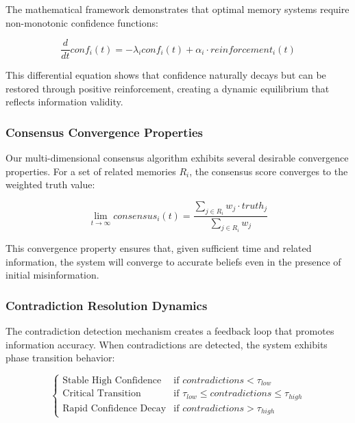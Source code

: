 \documentclass[12pt,a4paper]{article}
\begin{document}
The mathematical framework demonstrates that optimal memory systems require non-monotonic confidence functions:

\begin{equation}
\frac{d}{dt}conf_i(t) = -\lambda_i conf_i(t) + \alpha_i \cdot reinforcement_i(t)
\end{equation}

This differential equation shows that confidence naturally decays but can be restored through positive reinforcement, creating a dynamic equilibrium that reflects information validity.

\subsubsection{Consensus Convergence Properties}

Our multi-dimensional consensus algorithm exhibits several desirable convergence properties. For a set of related memories $R_i$, the consensus score converges to the weighted truth value:

\begin{equation}
\lim_{t \to \infty} consensus_i(t) = \frac{\sum_{j \in R_i} w_j \cdot truth_j}{\sum_{j \in R_i} w_j}
\end{equation}

This convergence property ensures that, given sufficient time and related information, the system will converge to accurate beliefs even in the presence of initial misinformation.

\subsubsection{Contradiction Resolution Dynamics}

The contradiction detection mechanism creates a feedback loop that promotes information accuracy. When contradictions are detected, the system exhibits phase transition behavior:

\begin{equation}
\begin{cases}
\text{Stable High Confidence} & \text{if } contradictions < \tau_{low} \\
\text{Critical Transition} & \text{if } \tau_{low} \leq contradictions \leq \tau_{high} \\
\text{Rapid Confidence Decay} & \text{if } contradictions > \tau_{high}
\end{cases}
\end{equation}
\end{document}
